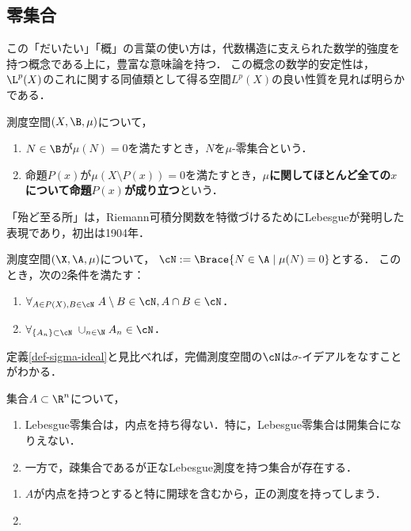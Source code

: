 \documentclass[uplatex, dvipdfmx]{jsreport}
\begin{document}
\subsection{零集合}

\begin{tcolorbox}[colframe=ForestGreen, colback=ForestGreen!10!white,breakable,colbacktitle=ForestGreen!40!white,coltitle=black,fonttitle=\bfseries\sffamily,
title=]
    この「だいたい」「概」の言葉の使い方は，代数構造に支えられた数学的強度を持つ概念である上に，豊富な意味論を持つ．
    この概念の数学的安定性は，$\L^p(X)$のこれに関する同値類として得る空間$L^p(X)$の良い性質を見れば明らかである．
\end{tcolorbox}

\begin{definition}
    測度空間$(X,\B,\mu)$について，
    \begin{enumerate}
        \item $N\in\B$が$\mu(N)=0$を満たすとき，$N$を$\mu$-零集合という．
        \item 命題$P(x)$が$\mu(X\setminus P(x))=0$を満たすとき，\textbf{$\mu$に関してほとんど全ての$x$について命題$P(x)$が成り立つ}という．
    \end{enumerate}
\end{definition}
\begin{history}
    「殆ど至る所」は，Riemann可積分関数を特徴づけるためにLebesgueが発明した表現であり，初出は1904年\cite{Lebesgue04}．
\end{history}

\begin{lemma}
    測度空間$(\X,\A,\mu)$について，
    $\cN:=\Brace{N\in\A\mid \mu(N)=0}$とする．
    このとき，次の2条件を満たす：
    \begin{enumerate}
        \item $\forall_{A\in P(X),B\in\cN}\;A\setminus B\in\cN,A\cap B\in\cN$．
        \item $\forall_{\{A_n\}\subset\cN}\;\cup_{n\in\N}A_n\in\cN$．
    \end{enumerate}
    定義\ref{def-sigma-ideal}と見比べれば，完備測度空間の$\cN$は$\sigma$-イデアルをなすことがわかる．
\end{lemma}

\begin{lemma}
    集合$A\subset\R^n$について，
    \begin{enumerate}
        \item Lebesgue零集合は，内点を持ち得ない．特に，Lebesgue零集合は開集合になりえない．
        \item 一方で，疎集合であるが正なLebesgue測度を持つ集合が存在する．
    \end{enumerate}
\end{lemma}
\begin{Proof}\mbox{}
    \begin{enumerate}
        \item $A$が内点を持つとすると特に開球を含むから，正の測度を持ってしまう．
        \item 
    \end{enumerate}
\end{Proof}
\end{document}
